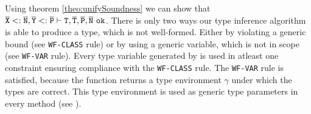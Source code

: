 Using theorem \ref{theo:unifySoundness} we can show that $\overline{\tt X} <: \overline{\tt N}, \overline{\tt Y} <: \overline{\tt P} \vdash \texttt{T}, \overline{\tt T}, \overline{\tt P}, \overline{\tt N}\ \texttt{ok}$.
There is only two ways our type inference algorithm is able to produce a type, which is not well-formed.
Either by violating a generic bound (see \texttt{WF-CLASS} rule)
or by using a generic variable, which is not in scope (see \texttt{WF-VAR} rule).
Every type variable generated by \fjtype{} is used in atleast one constraint ensuring compliance with the \texttt{WF-CLASS} rule.
The \texttt{WF-VAR} rule is satisfied, because the \unify{} function returns a type environment $\gamma$ under which the types are correct.
This type environment is used as generic type parameters in every method (see \fjtypeinference{}). 


